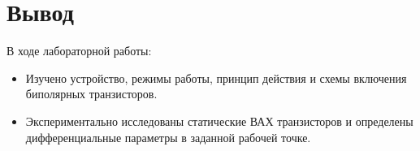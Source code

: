 \section{Вывод}
В ходе лабораторной работы:
\begin{itemize}
\item
  Изучено устройство, режимы работы, принцип действия и схемы включения биполярных транзисторов.
\item
  Экспериментально исследованы статические ВАХ транзисторов и определены дифференциальные параметры в заданной рабочей точке.

\end{itemize}
\clearpage
